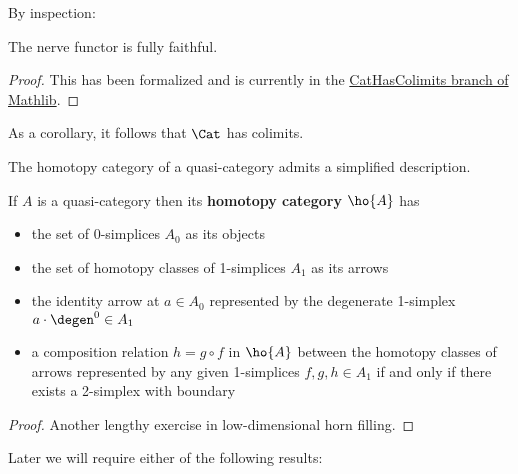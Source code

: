    By inspection:

   \begin{proposition}\label{prop:nerve-fully-faithful}
     \leanok
    The nerve functor is fully faithful.
   \end{proposition}
   \begin{proof}
    \leanok
  This has been formalized and is currently in the \href{https://github.com/leanprover-community/mathlib4/tree/CatHasColimits}{CatHasColimits branch of Mathlib}.
  \end{proof}


   As a corollary, it follows that $\Cat$ has colimits.

   The homotopy category of a quasi-category admits a simplified description.

   \begin{lemma}\label{lem:htpy-cat-of-qcat} If $A$ is a quasi-category then its \textbf{homotopy category} $\ho{A}$ has
   \begin{itemize}
   \item the set of 0-simplices $A_0$ as its objects
   \item the set of homotopy classes of 1-simplices $A_1$ as its arrows
   \item the identity arrow at $a \in A_0$ represented by the degenerate 1-simplex $a \cdot \degen^0 \in A_1$
   \item a composition relation $h = g \circ f$ in $\ho{A}$ between the homotopy classes of arrows represented by any given 1-simplices $f,g,h \in A_1$ if and only if there exists a 2-simplex with boundary
   \begin{center}
   \end{center}
   \end{itemize}
   \end{lemma}
 \begin{proof}
  Another lengthy exercise in low-dimensional horn filling.
 \end{proof}

Later we will require either of the following results:

